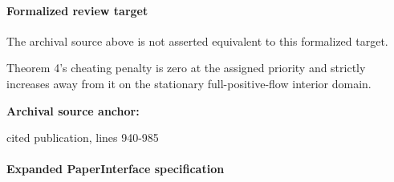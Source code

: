 \documentclass[10pt]{article}
\begin{document}
\paragraph{Formalized review target}
The archival source above is not asserted equivalent to this formalized target.
\begin{ReviewVerbatim}
Theorem 4's cheating penalty is zero at the assigned priority and strictly increases away from it on the stationary full-positive-flow interior domain.
\end{ReviewVerbatim}

\textbf{Archival source anchor:} {\footnotesize\raggedright cited publication, lines 940-\allowbreak{}985\par}
\paragraph{Expanded PaperInterface specification}
\end{document}
